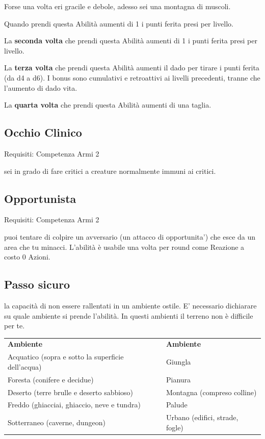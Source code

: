 \documentclass[a4paper,11pt,twoside,openany]{book}
\begin{document}
Forse una volta eri gracile e debole, adesso sei una montagna di muscoli.

Quando prendi questa Abilità aumenti di 1 i punti ferita presi per livello.

La \textbf{seconda volta} che prendi questa Abilità aumenti di 1 i punti ferita presi per livello.

La \textbf{terza volta} che prendi questa Abilità aumenti il dado per tirare i punti ferita (da d4 a d6).
I bonus sono cumulativi e retroattivi ai livelli precedenti, tranne che l’aumento di dado vita.

La \textbf{quarta volta} che prendi questa Abilità aumenti di una taglia.

\subsection{Occhio Clinico}

Requisiti: Competenza Armi 2

sei in grado di fare critici a creature normalmente immuni ai critici.

\subsection{Opportunista}

Requisiti: Competenza Armi 2

puoi tentare di colpire un avversario (un attacco di opportunita') che esce da un area che tu minacci. L'abilità è usabile una volta per round come Reazione a costo 0 Azioni.

\subsection{Passo sicuro}

la capacità di non essere rallentati in un ambiente ostile. E' necessario dichiarare su quale ambiente si prende l'abilità. In questi ambienti il terreno non è difficile per te.

\bigskip

\begin{tabular}{ll}
	\toprule
	\textbf{Ambiente}                                  & \textbf{Ambiente}\\
	Acquatico (sopra e sotto la superficie dell'acqua) & Giungla\\
	Foresta (conifere e decidue)                       & Pianura\\
	Deserto (terre brulle e deserto sabbioso)          & Montagna (compreso colline)\\
	Freddo (ghiacciai, ghiaccio, neve e tundra)        & Palude\\
	Sotterraneo (caverne, dungeon)                     & Urbano (edifici, strade, fogle)\\
\end{tabular}
\end{document}
